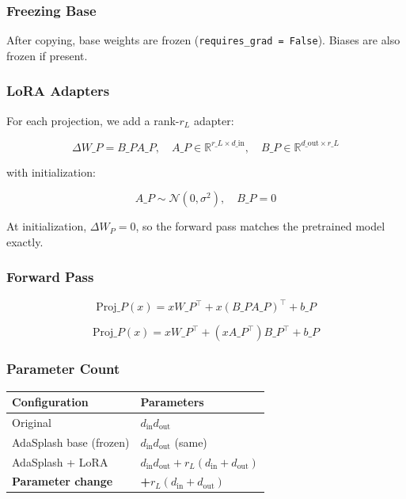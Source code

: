 \subsubsection{Freezing Base}

After copying, base weights are frozen (\texttt{requires\_grad = False}). Biases are 
also frozen if present.

\subsubsection{LoRA Adapters}

For each projection, we add a rank-$r_L$ adapter:

\[
\Delta W\_P = B\_P A\_P, \quad A\_P \in \mathbb{R}^{r\_L \times d\_\text{in}}, \quad B\_P \in \mathbb{R}^{d\_\text{out} \times r\_L}
\tag{4.3}
\]

with initialization:

\[
A\_P \sim \mathcal{N}(0, \sigma^2), \quad B\_P = 0
\tag{4.4}
\]

At initialization, $\Delta W_P = 0$, so the forward pass matches the 
pretrained model exactly.

\subsubsection{Forward Pass}

\[
\text{Proj}\_P(x) = x W\_P^\top + x (B\_P A\_P)^\top + b\_P
\tag{4.5}
\]

\[
\text{Proj}\_P(x) = x W\_P^\top + (x A\_P^\top) B\_P^\top + b\_P
\tag{4.6}
\]

\subsubsection{Parameter Count}

\begin{table}[H]
\centering
\small
\begin{tabular}{ll}
\toprule
\textbf{Configuration} & \textbf{Parameters} \\
\midrule
Original & $d_\text{in} d_\text{out}$ \\
AdaSplash base (frozen) & $d_\text{in} d_\text{out}$ (same) \\
AdaSplash + LoRA & $d_\text{in} d_\text{out} + r_L (d_\text{in} + d_\text{out})$ \\
\textbf{Parameter change} & \textbf{+$r_L (d_\text{in} + d_\text{out})$} \\
\bottomrule
\end{tabular}
\end{table}

